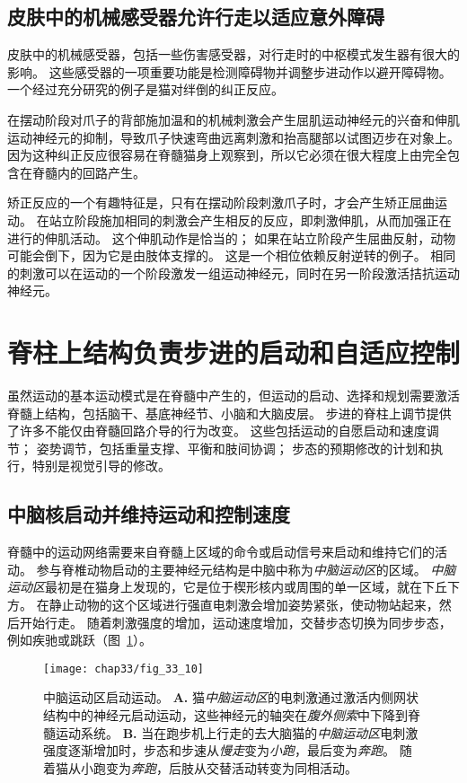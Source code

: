 \subsection{皮肤中的机械感受器允许行走以适应意外障碍}

皮肤中的机械感受器，包括一些伤害感受器，对行走时的中枢模式发生器有很大的影响。
这些感受器的一项重要功能是检测障碍物并调整步进动作以避开障碍物。
一个经过充分研究的例子是猫对绊倒的纠正反应。


在摆动阶段对爪子的背部施加温和的机械刺激会产生屈肌运动神经元的兴奋和伸肌运动神经元的抑制，导致爪子快速弯曲远离刺激和抬高腿部以试图迈步在对象上。
因为这种纠正反应很容易在脊髓猫身上观察到，所以它必须在很大程度上由完全包含在脊髓内的回路产生。


矫正反应的一个有趣特征是，只有在摆动阶段刺激爪子时，才会产生矫正屈曲运动。
在站立阶段施加相同的刺激会产生相反的反应，即刺激伸肌，从而加强正在进行的伸肌活动。
这个伸肌动作是恰当的；
如果在站立阶段产生屈曲反射，动物可能会倒下，因为它是由肢体支撑的。
这是一个相位依赖反射逆转的例子。
相同的刺激可以在运动的一个阶段激发一组运动神经元，同时在另一阶段激活拮抗运动神经元。



\section{脊柱上结构负责步进的启动和自适应控制}

虽然运动的基本运动模式是在脊髓中产生的，但运动的启动、选择和规划需要激活脊髓上结构，包括脑干、基底神经节、小脑和大脑皮层。
步进的脊柱上调节提供了许多不能仅由脊髓回路介导的行为改变。
这些包括运动的自愿启动和速度调节；
姿势调节，包括重量支撑、平衡和肢间协调；
步态的预期修改的计划和执行，特别是视觉引导的修改。



\subsection{中脑核启动并维持运动和控制速度}

脊髓中的运动网络需要来自脊髓上区域的命令或启动信号来启动和维持它们的活动。
参与脊椎动物启动的主要神经元结构是中脑中称为\textit{中脑运动区}的区域。
\textit{中脑运动区}最初是在猫身上发现的，它是位于楔形核内或周围的单一区域，就在下丘下方。
在静止动物的这个区域进行强直电刺激会增加姿势紧张，使动物站起来，然后开始行走。
随着刺激强度的增加，运动速度增加，交替步态切换为同步步态，例如疾驰或跳跃（图~\ref{fig:33_10}）。


\begin{figure}[htbp]
	\centering
	\texttt{[image: chap33/fig\_33\_10]}
	\caption{中脑运动区启动运动。
		\textbf{A.} 猫\textit{中脑运动区}的电刺激通过激活内侧网状结构中的神经元启动运动，这些神经元的轴突在\textit{腹外侧索}中下降到脊髓运动系统。
		\textbf{B.} 当在跑步机上行走的去大脑猫的\textit{中脑运动区}电刺激强度逐渐增加时，步态和步速从\textit{慢走}变为\textit{小跑}，最后变为\textit{奔跑}。
		随着猫从小跑变为\textit{奔跑}，后肢从交替活动转变为同相活动。}
	\label{fig:33_10}
\end{figure}



